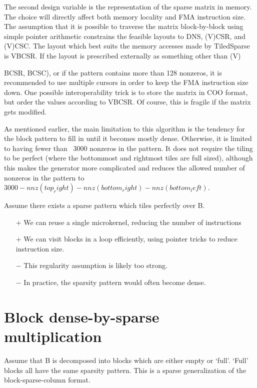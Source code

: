 The second design variable is the representation of the sparse matrix in memory. The choice will
directly affect both memory locality and FMA instruction size. The assumption that it is possible to traverse the matrix block-by-block using simple pointer arithmetic constrains 
the feasible layouts to DNS, (V)CSR, and (V)CSC. The layout which best suits the 
memory accesses made by TiledSparse 
is VBCSR. If the layout is prescribed externally as something other than (V){BCSR, BCSC), 
or if the pattern contains more than 128 nonzeros, it is recommended to use multiple cursors in 
order to keep the FMA instruction size down. One possible interoperability trick is to store 
the matrix in COO format, but order the values according to VBCSR. Of course, this is fragile 
if the matrix gets modified.

As mentioned earlier, the main limitation to this algorithm is the tendency for the block pattern to 
fill in until it becomes mostly dense. Otherwise, it is limited to having fewer than ~3000 nonzeros 
in the pattern. It does not require the tiling to be perfect (where the bottommost and rightmost 
tiles are full sized), although this makes the generator more complicated and reduces the allowed 
number of nonzeros in the pattern to $3000 - nnz(top_right) - nnz(bottom_right) - nnz(bottom_left)$. 



        Assume there exists a sparse pattern which tiles perfectly over B.
        \begin{itemize}
        \item[$+$] We can reuse a single microkernel, reducing the number of instructions
        \item[$+$] We can visit blocks in a loop efficiently, using pointer tricks to reduce instruction size.
        \item[$-$] This regularity assumption is likely too strong.
        \item[$-$] In practice, the sparsity pattern would often become dense.
        \end{itemize}




\section{Block dense-by-sparse multiplication}

  Assume that B is decomposed into blocks which are either empty or `full'. `Full' blocks all have the same sparsity pattern. This is a sparse generalization of the block-sparse-column format.

}
